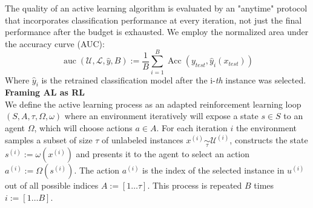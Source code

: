 \documentclass[]{article}
\begin{document}
The quality of an active learning algorithm is evaluated by an "anytime" protocol that incorporates classification performance at every iteration, not just the final performance after the budget is exhausted.
We employ the normalized area under the accuracy curve (AUC):
\begin{equation}
	\operatorname{auc}(\mathcal{U}, \mathcal{L}, \hat y, B) := \frac{1}{B} \sum_{i=1}^{B} \operatorname{Acc}(y_{test}, \hat y_i(x_{test}))
\end{equation}
Where $\hat y_i$ is the retrained classification model after the i-\textit{th} instance was selected. \\ [1mm]
%
\textbf{Framing AL as RL}\\
We define the active learning process as an adapted reinforcement learning loop $(S, A, \tau, \Omega, \omega)$ where an environment iteratively will expose a state $s \in S$ to an agent $\Omega$, which will choose actions $a \in A$.
For each iteration $i$ the environment samples a subset of size $\tau$ of unlabeled instances $x^{(i)} \underset{\tau}{\sim} \mathcal{U}^{(i)}$, constructs the state $s^{(i)} := \omega(x^{(i)})$ and presents it to the agent to select an action $a^{(i)} := \Omega(s^{(i)})$.
The action $a^{(i)}$ is the index of the selected instance in $u^{(i)}$ out of all possible indices $A := [1 \ldots \tau]$.
This process is repeated $B$ times $i := [1 \ldots B]$.
\end{document}
